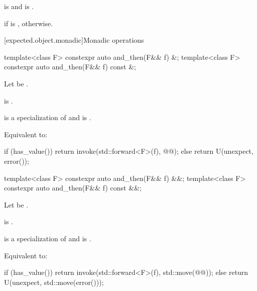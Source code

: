 \begin{itemdescr}
\pnum
\mandates
{} is
 and
 is
.

\pnum
\returns
{} if  is ,
 otherwise.
\end{itemdescr}

[expected.object.monadic]{Monadic operations}

%
\begin{itemdecl}
template<class F> constexpr auto and_then(F&& f) &;
template<class F> constexpr auto and_then(F&& f) const &;
\end{itemdecl}

\begin{itemdescr}
\pnum
Let  be .

\pnum
\constraints
{} is .

\pnum
\mandates
{} is a specialization of  and
 is .

\pnum
\effects
Equivalent to:
\begin{codeblock}
if (has_value())
  return invoke(std::forward<F>(f), @@);
else
  return U(unexpect, error());
\end{codeblock}
\end{itemdescr}

%
\begin{itemdecl}
template<class F> constexpr auto and_then(F&& f) &&;
template<class F> constexpr auto and_then(F&& f) const &&;
\end{itemdecl}

\begin{itemdescr}
\pnum
Let  be
.

\pnum
\constraints
{} is .

\pnum
\mandates
{} is a specialization of  and
 is .

\pnum
\effects
Equivalent to:
\begin{codeblock}
if (has_value())
  return invoke(std::forward<F>(f), std::move(@@));
else
  return U(unexpect, std::move(error()));
\end{codeblock}
\end{itemdescr}

